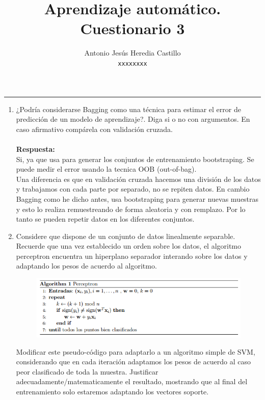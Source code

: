 \documentclass[12pt,a4paper]{article}
\newcommand{\horrule}[1]{\rule{\linewidth}{#1}} %
\begin{document}
\title{Aprendizaje autom\'atico. Cuestionario 3}

\author{
  Antonio Jesús Heredia Castillo\\
  \texttt{xxxxxxxx}
}

\date{}
\maketitle
\horrule{2pt}

\begin{enumerate}
	\item ¿Podría considerarse Bagging como una técnica para estimar el error de predicción de un
modelo de aprendizaje?. Diga si o no con argumentos. En caso afirmativo compárela con
	validación cruzada.\\\\
	\textbf{Respuesta: }\\
	Si, ya que usa para generar los conjuntos de entrenamiento bootstraping. Se puede medir el error usando la tecnica OOB (out-of-bag).\\
	Una diferencia es que en validación cruzada  hacemos una división de los datos y trabajamos con cada parte por separado, no se repiten datos. En cambio Bagging como he dicho antes, usa bootstraping para  generar nuevas muestras y esto lo realiza remuestreando de forma aleatoria y con remplazo. Por lo tanto se pueden repetir datos en los diferentes conjuntos.
	
	 
	\item Considere que dispone de un conjunto de datos linealmente separable. Recuerde que una
vez establecido un orden sobre los datos, el algoritmo perceptron encuentra un hiperplano
separador interando sobre los datos y adaptando los pesos de acuerdo al algoritmo.
\begin{figure}[H]
	\centering
	\includegraphics[width=0.7\linewidth]{perceptron}

	\label{fig:perceptron}
\end{figure}

	Modificar este pseudo-código para adaptarlo a un algoritmo simple de SVM, considerando
	que en cada iteración adaptamos los pesos de acuerdo al caso peor clasificado de toda la
	muestra. Justificar adecuadamente/matematicamente el resultado, mostrando que al final
	del entrenamiento solo estaremos adaptando los vectores soporte.


\end{enumerate}
\end{document}
